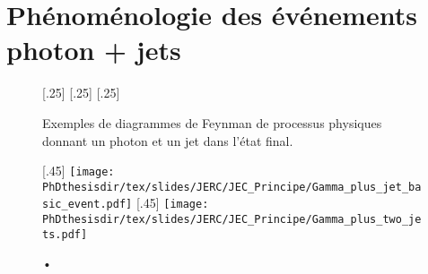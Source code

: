 \section{Phénoménologie des événements photon + jets}

\begin{figure}[h]
\centering\vspace{\baselineskip}
\subcaptionbox{\label{subfig-fgraph-gq_qGamma_S}}[.25\textwidth]
{}
\qquad
\subcaptionbox{\label{subfig-fgraph-gq_qGamma_T}}[.25\textwidth]
{}
\qquad
\subcaptionbox{\label{subfig-fgraph-qq_gGamma}}[.25\textwidth]
{}
\caption{Exemples de diagrammes de Feynman de processus physiques donnant un photon et un jet dans l'état final.}
\label{fig-fgraph-gamma_plus_jets}
\end{figure}

\begin{figure}[h]
\centering
\subcaptionbox{\label{subfig-Gamma_plus_jet_basic_event}}[.45\textwidth]
{\texttt{[image: \\PhDthesisdir/tex/slides/JERC/JEC\_Principe/Gamma\_plus\_jet\_basic\_event.pdf]}}
\qquad
\subcaptionbox{\label{subfig-Gamma_plus_two_jets}}[.45\textwidth]
{\texttt{[image: \\PhDthesisdir/tex/slides/JERC/JEC\_Principe/Gamma\_plus\_two\_jets.pdf]}}
\caption{•}
\label{fig-Gamma_plus_jet_events}
\end{figure}
